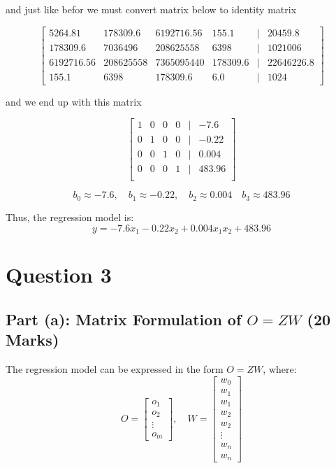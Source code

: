 \documentclass{article}
\begin{document}
	and just like befor we must convert matrix below to identity matrix
	
	\[
	\begin{bmatrix}
		5264.81 & 178309.6 & 6192716.56 & 155.1 & \vert & 20459.8 \\
		178309.6 & 7036496 & 208625558 & 6398 & \vert & 1021006 \\
		6192716.56 & 208625558 & 7365095440 & 178309.6 & \vert & 22646226.8 \\
		155.1 & 6398 & 178309.6 & 6.0 & \vert & 1024
	\end{bmatrix}
	\]
	
	and we end up with this matrix
	
	\[
	\begin{bmatrix}
		1 & 0 & 0 & 0 & \vert & -7.6 \\
		0 & 1 & 0 & 0 & \vert & -0.22 \\
		0 & 0 & 1 & 0 & \vert & 0.004 \\
		0 & 0 & 0 & 1 & \vert & 483.96 \\
	\end{bmatrix}
	\]
	
	\[
	b_0 \approx -7.6, \quad b_1 \approx -0.22, \quad b_2 \approx 0.004 \quad b_3 \approx 483.96
	\]
	
	Thus, the regression model is:
	\[
	y = - 7.6 x_1 - 0.22 x_2 + 0.004 x_1 x_2 + 483.96
	\]
	
	
	\section*{Question 3}
	
	\subsection*{Part (a): Matrix Formulation of \( O = ZW \) (20 Marks)}
	
	The regression model can be expressed in the form \( O = ZW \), where:
	\[
	O = \begin{bmatrix} o_1 \\ o_2 \\ \vdots \\ o_m \end{bmatrix}, \quad 
	W = \begin{bmatrix} w_0 \\ w_1 \\ w_1 \\ w_2 \\ w_2 \\ \vdots \\ w_n \\ w_n \end{bmatrix}
	\]
	
\end{document}
